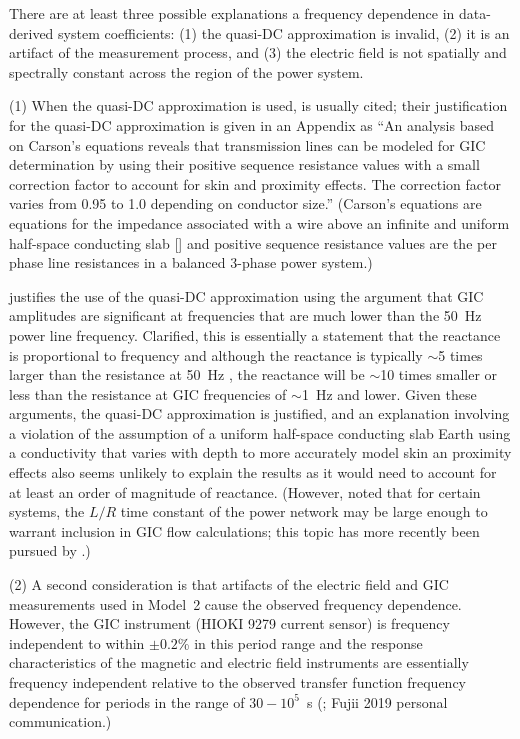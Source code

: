 \documentclass[draft,linenumbers]{agujournal2018}
\begin{document}
There are at least three possible explanations a frequency dependence in data-derived system coefficients: (1) the quasi-DC approximation is invalid, (2) it is an artifact of the measurement process, and (3) the electric field is not spatially and spectrally constant across the region of the power system.

(1) When the quasi-DC approximation is used, \cite{Albertson1981} is usually cited; their justification for the quasi-DC approximation is given in an Appendix as ``An analysis based on Carson's equations reveals that transmission lines can be modeled for GIC determination by using their positive sequence resistance values with a small correction factor to account for skin and proximity effects. The correction factor varies from 0.95 to 1.0 depending on conductor size.'' (Carson's equations are equations for the impedance associated with a wire above an infinite and uniform half-space conducting slab [\cite{Carson1926,Grigsby2007}] and positive sequence resistance values are the per phase line resistances in a balanced 3-phase power system.)

\cite{Lehtinen1985} justifies the use of the quasi-DC approximation using the argument that GIC amplitudes are significant at frequencies that are much lower than the 50~Hz power line frequency. Clarified, this is essentially a statement that the reactance is proportional to frequency and although the reactance is typically $\sim$5 times larger than the resistance at 50~Hz \citep{Purchala2005}, the reactance will be $\sim$10 times smaller or less than the resistance at GIC frequencies of $\sim$1~Hz and lower. Given these arguments, the quasi-DC approximation is justified, and an explanation involving a violation of the assumption of a uniform half-space conducting slab Earth using a conductivity that varies with depth to more accurately model skin an proximity effects also seems unlikely to explain the results as it would need to account for at least an order of magnitude of reactance. (However, \cite{Boteler1994} noted that for certain systems, the $L/R$ time constant of the power network may be large enough to warrant inclusion in GIC flow calculations; this topic has more recently been pursued by \cite{Oyedokun2013a}.)

(2) A second consideration is that artifacts of the electric field and GIC measurements used in Model~2 cause the observed frequency dependence. However, the GIC instrument (HIOKI 9279 current sensor) is frequency independent to within $\pm 0.2$\% in this period range and the response characteristics of the magnetic and electric field instruments are essentially frequency independent relative to the observed transfer function frequency dependence for periods in the range of $30-10^{5}$~s (\cite{Oowada1998}; Fujii 2019 personal communication.)
\end{document}
